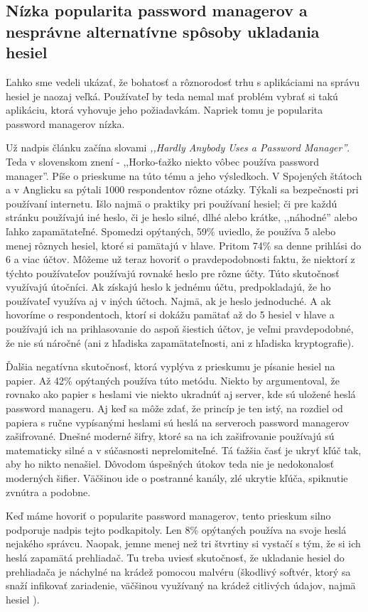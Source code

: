\subsection{Nízka popularita password managerov a nesprávne alternatívne spôsoby ukladania hesiel}
Ľahko sme vedeli ukázať, že bohatosť a rôznorodosť trhu s aplikáciami na správu hesiel je naozaj veľká. Používateľ by teda nemal mať problém vybrať si takú aplikáciu, ktorá vyhovuje jeho požiadavkám. Napriek tomu je popularita password managerov nízka. 
\par Už nadpis článku \cite{19} začína slovami \textit{,,Hardly Anybody Uses a Password Manager''}. Teda v slovenskom znení - ,,Horko-ťažko niekto vôbec používa password manager''. Píše o prieskume na túto tému a jeho výsledkoch. V Spojených štátoch a v Anglicku sa pýtali 1000 respondentov rôzne otázky. Týkali sa bezpečnosti pri používaní internetu. Išlo najmä o praktiky pri používaní hesiel; či pre každú stránku používajú iné heslo, či je heslo silné, dlhé alebo krátke, ,,náhodné'' alebo ľahko zapamätateľné. Spomedzi opýtaných, 59\% uviedlo, že používa 5 alebo menej rôznych hesiel, ktoré si pamätajú v hlave. Pritom 74\% sa denne prihlási do 6 a viac účtov. Môžeme už teraz hovoriť o pravdepodobnosti faktu, že niektorí z týchto používateľov používajú rovnaké heslo pre rôzne účty. Túto skutočnosť využívajú útočníci. Ak získajú heslo k jednému účtu, predpokladajú, že ho používateľ využíva aj v iných účtoch. Najmä, ak je heslo jednoduché. A ak hovoríme o respondentoch, ktorí si dokážu pamätať až do 5 hesiel v hlave a používajú ich na prihlasovanie do aspoň šiestich účtov, je veľmi pravdepodobné, že nie sú náročné (ani z hľadiska zapamätateľnosti, ani z hľadiska kryptografie).
\par Ďalšia negatívna skutočnosť, ktorá vyplýva z prieskumu je písanie hesiel na papier. Až 42\% opýtaných používa túto metódu. Niekto by argumentoval, že rovnako ako papier s heslami vie niekto ukradnúť aj server, kde sú uložené heslá password manageru. Aj keď sa môže zdať, že princíp je ten istý, na rozdiel od papiera s ručne vypísanými heslami sú heslá na serveroch password managerov zašifrované. Dnešné moderné šifry, ktoré sa na ich zašifrovanie používajú sú matematicky silné a v súčasnosti neprelomiteľné. Tá ťažšia časť je ukryť kľúč tak, aby ho nikto nenašiel. Dôvodom úspešných útokov teda nie je nedokonalosť moderných šifier. Väčšinou ide o postranné kanály, zlé ukrytie kľúča, spiknutie zvnútra a podobne.
\par Keď máme hovoriť o popularite password managerov, tento prieskum silno podporuje nadpis tejto podkapitoly. Len 8\% opýtaných používa na svoje heslá nejakého správcu. Naopak, jemne menej než tri štvrtiny si vystačí s tým, že si ich heslá zapamätá prehliadač. Tu treba uviesť skutočnosť, že ukladanie hesiel do prehliadača je náchylné na krádež pomocou malvéru (škodlivý softvér, ktorý sa snaží infikovať zariadenie, väčšinou využívaný na krádež citlivých údajov, najmä hesiel \cite{20}). 
